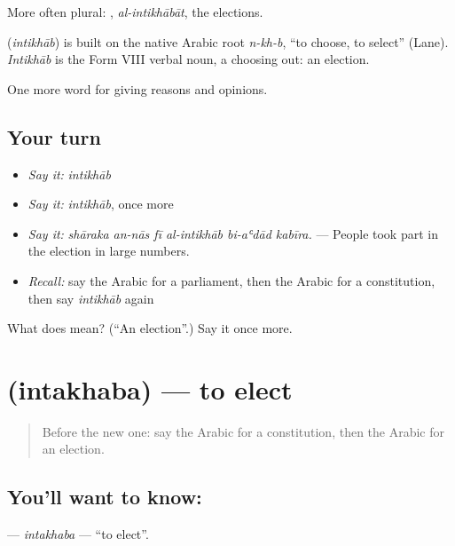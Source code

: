 More often plural: , \emph{al-intikhābāt}, the elections.

\begin{cousinweb}
\textbf{} (\emph{intikhāb}) is built on the native Arabic root \emph{n-kh-b}, \textquotedblleft{}to choose, to select\textquotedblright{} (Lane). \emph{Intikhāb} is the Form VIII verbal noun, a choosing out: an election.
\end{cousinweb}

\begin{grammarlens}[title={What you've built}]
One more word for giving reasons and opinions.
\end{grammarlens}

\subsection*{Your turn}
\begin{itemize}
\raggedright
  \item \emph{Say it:} \emph{intikhāb}
  \item \emph{Say it:} \emph{intikhāb}, once more
  \item \emph{Say it:} \emph{shāraka an-nās fī al-intikhāb bi-aʿdād kabīra.} — People took part in the election in large numbers.
  \item \emph{Recall:} say the Arabic for a parliament, then the Arabic for a constitution, then say \emph{intikhāb} again
\end{itemize}

\begin{tcolorbox}[breakable,colback=teal!4,colframe=teal!35!black,title={Before you move on}]
What does  mean? (\textquotedblleft{}An election\textquotedblright{}.) Say it once more.
\end{tcolorbox}
\section[\texorpdfstring{\ar{انتخب} (intakhaba)}{انتخب (intakhaba)}]{ (intakhaba) — to elect}

\label{lesson:AR-C378-intakhaba}



\begin{quote}
Before the new one: say the Arabic for a constitution, then the Arabic for an election.
\end{quote}

\subsection*{You'll want to know: }
\textbf{} — \emph{intakhaba} — \textquotedblleft{}to elect\textquotedblright{}.

